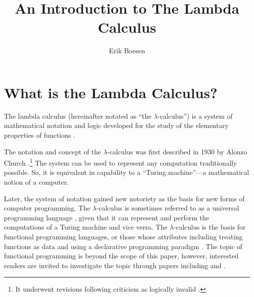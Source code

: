 \documentclass{article}
\begin{document}
\title{An Introduction to The Lambda Calculus}
\author{Erik Boesen}
\maketitle
{}
\begin{abstract}
\end{abstract}

\section{What is the Lambda Calculus?}
The lambda calculus (hereinafter notated as ``the $\lambda$-calculus'') is a system of mathematical notation and logic developed for the study of the elementary properties of functions \cite{rojastutorial}.

The notation and concept of the $\lambda$-calculus was first described in 1930 by Alonzo Church \cite{church}.\footnote{It underwent revisions following criticism as logically invalid \cite{church2}.} The system can be used to represent any computation traditionally possible. So, it is equivalent in capability to a ``Turing machine''—a mathematical notion of a computer.

Later, the system of notation gained new notoriety as the basis for new forms of computer programming. The $\lambda$-calculus is sometimes referred to as a universal programming language \cite{rojastutorial}, given that it can represent and perform the computations of a Turing machine and vice versa. The $\lambda$-calculus is the basis for functional programming languages, or those whose attributes including treating functions as data and using a declarative programming paradigm \cite{hudakevolution}. The topic of functional programming is beyond the scope of this paper, however, interested readers are invited to investigate the topic through papers including \cite{totalfp} and \cite{hudakevolution}.
\end{document}
